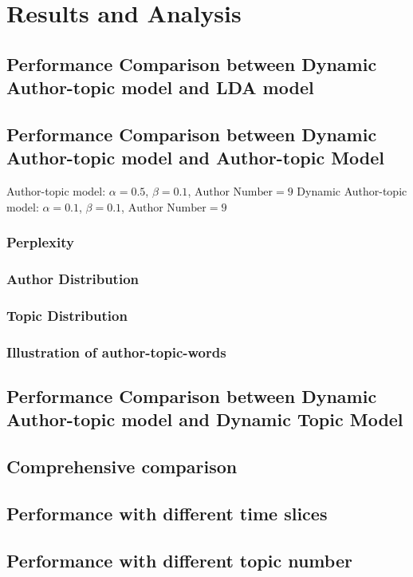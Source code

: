 \chapter{Results and Analysis}
\label{chapterlabel5}

\section{Performance Comparison between Dynamic Author-topic model and LDA model}
\section{Performance Comparison between Dynamic Author-topic model and Author-topic Model}

Author-topic model: $\alpha = 0.5$, $\beta = 0.1$, $\text{Author Number} = 9$
Dynamic Author-topic model: $\alpha = 0.1$, $\beta = 0.1$, $\text{Author Number} = 9$

\subsection{Perplexity}
\subsection{Author Distribution}
\subsection{Topic Distribution}
\subsection{Illustration of author-topic-words}

\section{Performance Comparison between Dynamic Author-topic model and Dynamic Topic Model}
\section{Comprehensive comparison}
\section{Performance with different time slices}
\section{Performance with different topic number}

\blindtext
